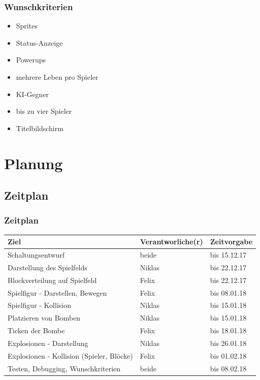 \documentclass[18pt]{beamer}
\begin{document}
		\begin{frame}
			\frametitle{Wunschkriterien}
			\begin{itemize}
				\item Sprites
				\item Status-Anzeige
				\item Powerups
				\item mehrere Leben pro Spieler
				\item KI-Gegner
				\item bis zu vier Spieler
				\item Titelbildschirm
			\end{itemize}
		\end{frame}
	\section{Planung}
		\subsection{Zeitplan}
		\begin{frame}
			\frametitle{Zeitplan}
			\begin{table}[H]
				\centering
				\label{my-label}
				\begin{tabular}{l|l|l}
					Ziel                                      & Verantworliche(r) & Zeitvorgabe  \\
					\hline
					Schaltungsentwurf                         & beide           & bis 15.12.17 \\
					Darstellung des Spielfelds                & Niklas          & bis 22.12.17 \\
					Blockverteilung auf Spielfeld             & Felix           & bis 22.12.17 \\
					Spielfigur - Darstellen, Bewegen          & Felix           & bis 08.01.18 \\
					Spielfigur - Kollision                    & Niklas          & bis 15.01.18 \\
					Platzieren von Bomben                     & Niklas          & bis 15.01.18 \\
					Ticken der Bombe                          & Felix           & bis 18.01.18 \\
					Explosionen - Darstellung                 & Niklas          & bis 26.01.18 \\
					Explosionen - Kollision (Spieler, Blöcke) & Felix           & bis 01.02.18 \\
					Testen, Debugging, Wunschkriterien        & beide           & bis 08.02.18
				\end{tabular}
			\end{table}
		\end{frame}
		
\end{document}
